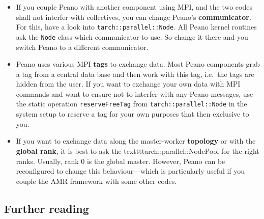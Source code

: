 \begin{itemize}
  \item If you couple Peano with another component using MPI, and the two codes
  shall not interfer with collectives, you can change Peano's {\bf
  communicator}.
  For this, have a look into \texttt{tarch::parallel::Node}. All Peano kernel
  routines ask the \texttt{Node} class which communicator to use. So change it
  there and you switch Peano to a different communicator.
  \item Peano uses various MPI {\bf tags} to exchange data. Most Peano
  components grab a tag from a central data base and then work with this tag,
  i.e.~the tags are hidden from the user. If you want to exchange your own data
  with MPI commands and want to ensure not to interfer with any Peano messages,
  use the static operation \texttt{reserveFreeTag} from \linebreak
  \texttt{tarch::parallel::Node} in the system setup to reserve a tag for your
  own purposes that then exclusive to you.
  \item If you want to exchange data along the master-worker {\bf topology} or
  with the {\bf global rank}, it is best to ask the
  texttt{tarch::parallel::NodePool} for the right ranks. Usually, rank 0 is the
  global master. However, Peano can be reconfigured to change this
  behaviour---which is particularly useful if you couple the AMR framework with
  some other codes.
\end{itemize}



\subsection*{Further reading}

